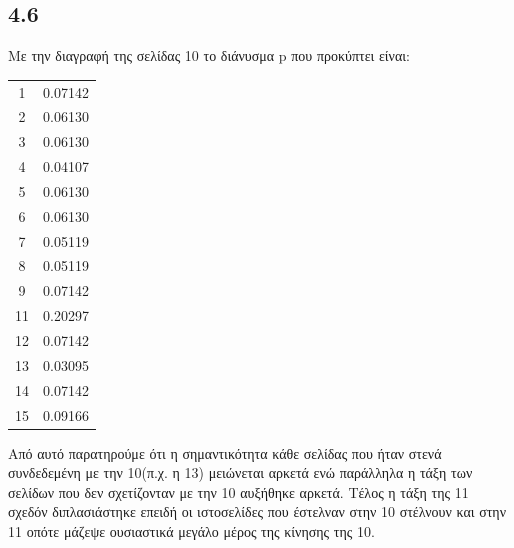 \documentclass[a4paper,11pt]{article}
\begin{document}
\begin{flushleft}
\subsection*{4.6}
Με την διαγραφή της σελίδας 10 το διάνυσμα p που προκύπτει είναι: 
\begin{center}
    \begin{tabular}{|c|c|}
        \hline
        1 & 0.07142 \\
        2 & 0.06130 \\
        3 & 0.06130 \\
        4 & 0.04107 \\
        5 & 0.06130 \\
        6 & 0.06130 \\
        7 & 0.05119 \\
        8 & 0.05119 \\
        9 & 0.07142 \\
        11 & 0.20297 \\
        12 & 0.07142 \\
        13 & 0.03095 \\
        14 & 0.07142 \\
        15 & 0.09166 \\
        \hline
    \end{tabular}
\end{center}
Από αυτό παρατηρούμε ότι η σημαντικότητα κάθε σελίδας που ήταν στενά συνδεδεμένη με την 10(π.χ. η 13) μειώνεται αρκετά ενώ παράλληλα η τάξη των σελίδων που δεν σχετίζονταν με την 10 αυξήθηκε αρκετά. Τέλος η τάξη της 11 σχεδόν διπλασιάστηκε επειδή οι ιστοσελίδες που έστελναν στην 10 στέλνουν και στην 11 οπότε μάζεψε ουσιαστικά μεγάλο μέρος της κίνησης της 10.
\end{flushleft}
\end{document}
